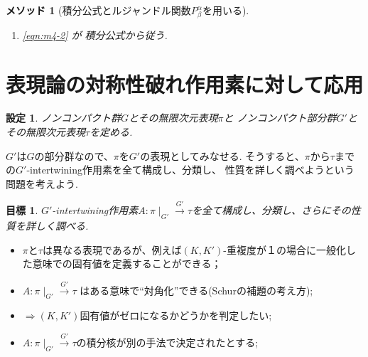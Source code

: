 \documentclass[12pt]{article} %
\newtheorem*{setting*}{\textbf{設定}}
\newtheorem*{goal*}{\textbf{目標}}
\newtheorem{method}{\textbf{メソッド}}
\theoremstyle{remark}
\renewcommand{\implies}{\Rightarrow}
\begin{document}
{\begin{method}[積分公式とルジャンドル関数$ P^\alpha_\beta$を用いる]
\begin{enumerate}
		\item \eqref{eqn:m4-2} が \cite[L2]{kobayashi2011schrodinger}積分公式から従う.
	\end{enumerate}
\end{method}
\section{表現論の対称性破れ作用素に対して応用}
\newcommand{\mysbo}{A:\pi\mid_{G'}\xrightarrow{G'}\tau}
	\begin{setting*}
ノンコンパクト群$G$とその無限次元表現$\pi$と
ノンコンパクト部分群$G'$とその無限次元表現$\tau$を定める.
	\centerline{
		\xymatrixcolsep{0.5pc}
		\xymatrixrowsep{1pc}
		}
	\end{setting*}
$G'$は$G$の部分群なので、$\pi$を$G'$の表現としてみなせる.
そうすると、$\pi$から$\tau$までの$G'$-intertwining作用素を全て構成し、分類し、
性質を詳しく調べようという問題を考えよう.
	\begin{goal*}
		$G'$-intertwining作用素$\mysbo$を全て構成し、分類し、さらにその性質を詳しく調べる.
	\end{goal*}
	\begin{itemize}
		\item $\pi$と$\tau$は異なる表現であるが、例えば$(K,K')$-重複度が１の場合に一般化した意味での固有値を定義することができる；
		\item $\mysbo$ はある意味で``対角化''できる(Schurの補題の考え方);
		\item $\implies(K,K')$固有値がゼロになるかどうかを判定したい;
		\item $\mysbo$の積分核が別の手法で決定されたとする;

\end{itemize}}
\end{document}
